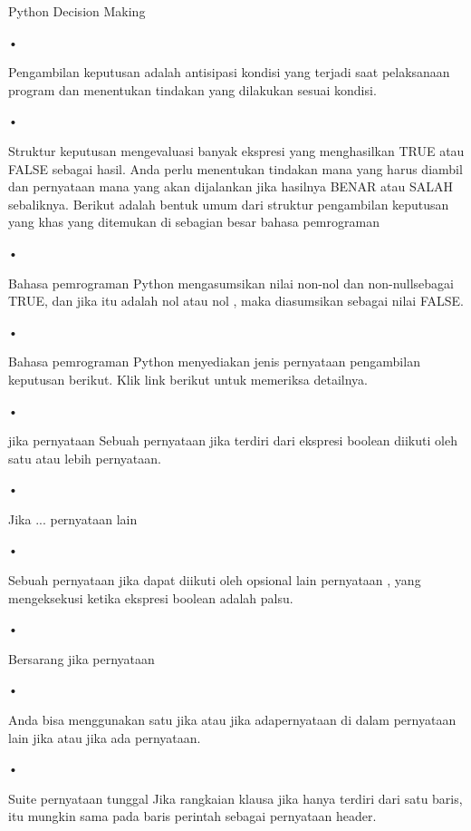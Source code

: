 Python Decision Making
\begin{flushleft}
•
\end{flushleft}Pengambilan keputusan adalah antisipasi kondisi yang terjadi saat pelaksanaan program dan menentukan tindakan yang dilakukan sesuai kondisi.
\begin{flushleft}
•
\end{flushleft}Struktur keputusan mengevaluasi banyak ekspresi yang menghasilkan TRUE atau FALSE sebagai hasil. Anda perlu menentukan tindakan mana yang harus diambil dan pernyataan mana yang akan dijalankan jika hasilnya BENAR atau SALAH sebaliknya.
Berikut adalah bentuk umum dari struktur pengambilan keputusan yang khas yang ditemukan di sebagian besar bahasa pemrograman 
\begin{flushleft}
•
\end{flushleft}Bahasa pemrograman Python mengasumsikan nilai non-nol dan non-nullsebagai TRUE, dan jika itu adalah nol atau nol , maka diasumsikan sebagai nilai FALSE.
\begin{flushleft}
•
\end{flushleft}Bahasa pemrograman Python menyediakan jenis pernyataan pengambilan keputusan berikut. Klik link berikut untuk memeriksa detailnya.

\begin{flushleft}
•
\end{flushleft}jika pernyataan
Sebuah pernyataan jika terdiri dari ekspresi boolean diikuti oleh satu atau lebih pernyataan.
\begin{flushleft}
•
\end{flushleft}Jika ... pernyataan lain
\begin{flushleft}
•
\end{flushleft}Sebuah pernyataan jika dapat diikuti oleh opsional lain pernyataan , yang mengeksekusi ketika ekspresi boolean adalah palsu.
\begin{flushleft}
•
\end{flushleft}Bersarang jika pernyataan
\begin{flushleft}
•
\end{flushleft}Anda bisa menggunakan satu jika atau jika adapernyataan di dalam pernyataan lain jika atau jika ada pernyataan.

\begin{flushleft}
•
\end{flushleft}Suite pernyataan tunggal
Jika rangkaian klausa jika hanya terdiri dari satu baris, itu mungkin sama pada baris perintah sebagai pernyataan header.
